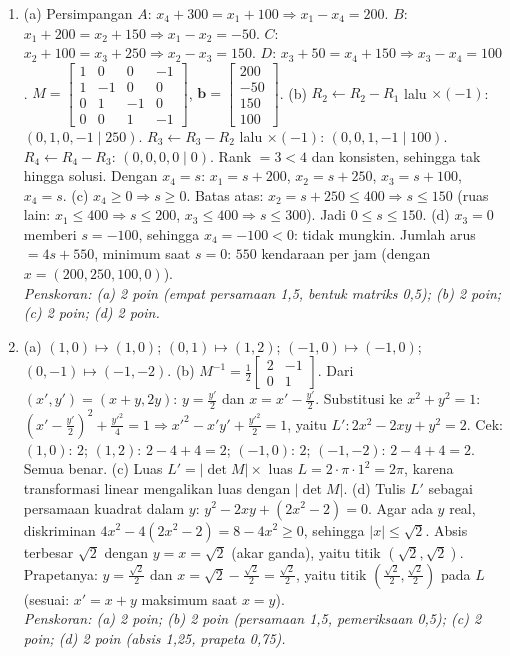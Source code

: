 \documentclass[a4paper,11pt]{article}
\begin{document}
\begin{enumerate}[leftmargin=2em,itemsep=3pt,topsep=2pt]
\item[\textbf{3.}] (a) Persimpangan $A$: $x_4+300=x_1+100\Rightarrow x_1-x_4=200$. $B$: $x_1+200=x_2+150\Rightarrow x_1-x_2=-50$. $C$: $x_2+100=x_3+250\Rightarrow x_2-x_3=150$. $D$: $x_3+50=x_4+150\Rightarrow x_3-x_4=100$. $M=\begin{bmatrix}1&0&0&-1\\1&-1&0&0\\0&1&-1&0\\0&0&1&-1\end{bmatrix}$, $\mathbf{b}=\begin{bmatrix}200\\-50\\150\\100\end{bmatrix}$. (b) $R_2\leftarrow R_2-R_1$ lalu $\times(-1)$: $(0,1,0,-1\mid250)$. $R_3\leftarrow R_3-R_2$ lalu $\times(-1)$: $(0,0,1,-1\mid100)$. $R_4\leftarrow R_4-R_3$: $(0,0,0,0\mid0)$. Rank $=3<4$ dan konsisten, sehingga tak hingga solusi. Dengan $x_4=s$: $x_1=s+200$, $x_2=s+250$, $x_3=s+100$, $x_4=s$. (c) $x_4\ge0\Rightarrow s\ge0$. Batas atas: $x_2=s+250\le400\Rightarrow s\le150$ (ruas lain: $x_1\le400\Rightarrow s\le200$, $x_3\le400\Rightarrow s\le300$). Jadi $0\le s\le150$. (d) $x_3=0$ memberi $s=-100$, sehingga $x_4=-100<0$: tidak mungkin. Jumlah arus $=4s+550$, minimum saat $s=0$: $550$ kendaraan per jam (dengan $x=(200,250,100,0)$). \\ \textit{Penskoran: (a) 2 poin (empat persamaan 1,5, bentuk matriks 0,5); (b) 2 poin; (c) 2 poin; (d) 2 poin.}
\item[\textbf{4.}] (a) $(1,0)\mapsto(1,0)$; $(0,1)\mapsto(1,2)$; $(-1,0)\mapsto(-1,0)$; $(0,-1)\mapsto(-1,-2)$. (b) $M^{-1}=\frac12\begin{bmatrix}2&-1\\0&1\end{bmatrix}$. Dari $(x',y')=(x+y,2y)$: $y=\frac{y'}{2}$ dan $x=x'-\frac{y'}{2}$. Substitusi ke $x^2+y^2=1$: $\left(x'-\frac{y'}{2}\right)^2+\frac{y'^2}{4}=1\Rightarrow x'^2-x'y'+\frac{y'^2}{2}=1$, yaitu $L':2x^2-2xy+y^2=2$. Cek: $(1,0)$: $2$; $(1,2)$: $2-4+4=2$; $(-1,0)$: $2$; $(-1,-2)$: $2-4+4=2$. Semua benar. (c) Luas $L'=|\det M|\times$ luas $L=2\cdot\pi\cdot1^2=2\pi$, karena transformasi linear mengalikan luas dengan $|\det M|$. (d) Tulis $L'$ sebagai persamaan kuadrat dalam $y$: $y^2-2xy+(2x^2-2)=0$. Agar ada $y$ real, diskriminan $4x^2-4(2x^2-2)=8-4x^2\ge0$, sehingga $|x|\le\sqrt2$. Absis terbesar $\sqrt2$ dengan $y=x=\sqrt2$ (akar ganda), yaitu titik $(\sqrt2,\sqrt2)$. Prapetanya: $y=\frac{\sqrt2}{2}$ dan $x=\sqrt2-\frac{\sqrt2}{2}=\frac{\sqrt2}{2}$, yaitu titik $\left(\frac{\sqrt2}{2},\frac{\sqrt2}{2}\right)$ pada $L$ (sesuai: $x'=x+y$ maksimum saat $x=y$). \\ \textit{Penskoran: (a) 2 poin; (b) 2 poin (persamaan 1,5, pemeriksaan 0,5); (c) 2 poin; (d) 2 poin (absis 1,25, prapeta 0,75).}

\end{enumerate}
\end{document}

